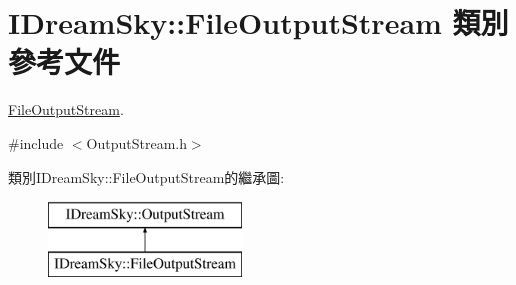 \hypertarget{class_i_dream_sky_1_1_file_output_stream}{}\section{I\+Dream\+Sky\+:\+:File\+Output\+Stream 類別 參考文件}
\label{class_i_dream_sky_1_1_file_output_stream}


\hyperlink{class_i_dream_sky_1_1_file_output_stream}{File\+Output\+Stream}.  




{\ttfamily \#include $<$Output\+Stream.\+h$>$}

類別\+I\+Dream\+Sky\+:\+:File\+Output\+Stream的繼承圖\+:\begin{figure}[H]
\begin{center}
\leavevmode
\includegraphics[height=2.000000cm]{class_i_dream_sky_1_1_file_output_stream}
\end{center}
\end{figure}
